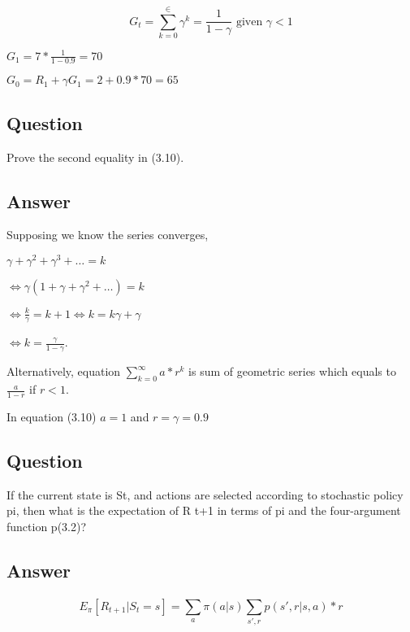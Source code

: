 \documentclass[11pt]{article}
\begin{document}
    \begin{equation}
        G_t = \sum_{k=0}^{\in} \gamma ^ k = \frac{1}{1-\gamma} \text{ given } \gamma < 1
    \end{equation}

    $G_1 = 7 * \frac{1}{1-0.9} = 70 $

    $G_0 = R_{1} + \gamma G_{1} = 2 + 0.9 * 70 = 65 $

    \subsection{Question}

    Prove the second equality in (3.10).

    \subsection*{Answer}

Supposing we know the series converges,

$\gamma + \gamma^2 + \gamma^3 + \dots = k$

$\Leftrightarrow \gamma(1+\gamma + \gamma^2 + \dots) = k$ 

$\Leftrightarrow \frac{k}{\gamma} = k + 1 \Leftrightarrow k = k\gamma + \gamma$

$\Leftrightarrow k = \frac{\gamma}{1-\gamma}$.

Alternatively, equation $\sum_{k=0}^{\infty}a*r^k$ is sum of geometric series which equals to $\frac{a}{1-r}$ if $r<1$.

In equation (3.10) $a=1$ and $r = \gamma = 0.9$

    \subsection{Question}

    If the current state is St, and actions are selected according to stochastic policy pi, then what is the expectation of R t+1 in terms of pi and the four-argument function p(3.2)?

    \subsection*{Answer}

    \begin{equation}
        E_{\pi}[R_{t+1}|S_{t}=s] = \sum_{a}^{} \pi(a|s) \sum_{s', r}^{} p(s',r|s, a) * r
    \end{equation}
\end{document}
